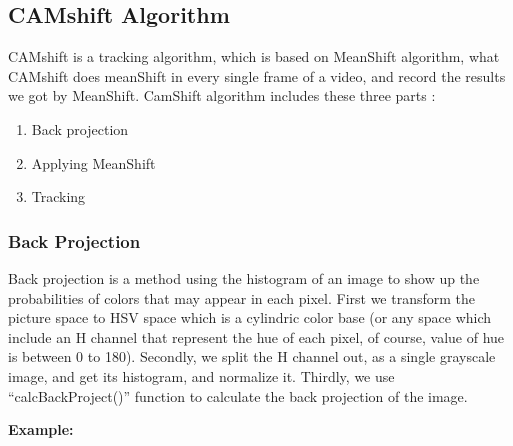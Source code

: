 \documentclass[a4paper,12pt]{report}
\begin{document}
\subsection{CAMshift Algorithm}
    CAMshift is a tracking algorithm, which is based on MeanShift algorithm, what CAMshift does meanShift in every single frame of a video, and record the results we got by MeanShift. 
    CamShift algorithm includes these three parts\cite{camshift} :
    
      \begin{enumerate}
	\item Back projection 
	\item Applying MeanShift
	\item Tracking
	    
      \end{enumerate}
  
  \subsubsection{Back Projection}
  
  Back projection is a method using the histogram of an image to show up the probabilities of colors that may appear in each pixel.
First we transform the picture space to HSV space which is a cylindric color base (or any space which include an H channel that represent the hue of each pixel, of course, value of hue is between 0 to 180). Secondly, we split the H channel out, as a single grayscale image, and get its histogram, and normalize it. Thirdly, we use “calcBackProject()” function to calculate the back projection of the image.

  \textbf{Example:} 
  
\end{document}
